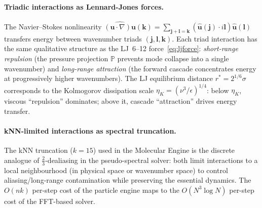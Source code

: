 \documentclass[final]{siamltex}
\providecommand{\grad}{\nabla}
\begin{document}
\paragraph{Triadic interactions as Lennard-Jones forces.}
The Navier--Stokes nonlinearity
$\widehat{(\bm{u}\cdot\grad)\bm{u}}(\bm{k})
= \sum_{\bm{j}+\bm{l}=\bm{k}}(\hat{\bm{u}}(\bm{j})\cdot
i\bm{l})\hat{\bm{u}}(\bm{l})$
transfers energy between wavenumber triads $(\bm{j},\bm{l},\bm{k})$.
Each triad interaction has the same qualitative structure as the
LJ~6--12 force~\eqref{eq:ljforce}: \emph{short-range repulsion}
(the pressure projection $\mathbb{P}$ prevents mode collapse into
a single wavenumber) and \emph{long-range attraction} (the forward
cascade concentrates energy at progressively higher wavenumbers).
The LJ equilibrium distance $r^* = 2^{1/6}\sigma$ corresponds
to the Kolmogorov dissipation scale
$\eta_K = (\nu^3/\epsilon)^{1/4}$: below $\eta_K$, viscous
``repulsion'' dominates; above it, cascade ``attraction'' drives
energy transfer.

\paragraph{kNN-limited interactions as spectral truncation.}
The kNN truncation ($k = 15$) used in the Molecular Engine is the
discrete analogue of $\tfrac{2}{3}$-dealiasing in the
pseudo-spectral solver: both limit interactions to a
local neighbourhood (in physical space or wavenumber space) to
control aliasing/long-range contamination while preserving the
essential dynamics.  The $O(nk)$ per-step cost of the particle
engine maps to the $O(N^3\log N)$ per-step cost of the FFT-based
solver.
\end{document}
